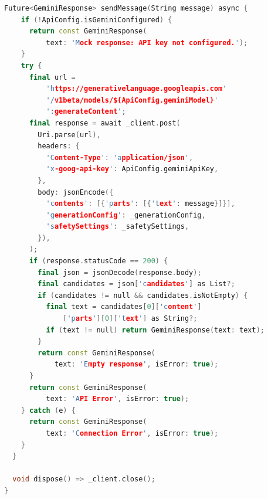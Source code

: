 \documentclass[12pt]{article}
\begin{document}
\begin{lstlisting}[language=C++]
  Future<GeminiResponse> sendMessage(String message) async {
    if (!ApiConfig.isGeminiConfigured) {
      return const GeminiResponse(
          text: 'Mock response: API key not configured.');
    }
    try {
      final url =
          'https://generativelanguage.googleapis.com'
          '/v1beta/models/${ApiConfig.geminiModel}'
          ':generateContent';
      final response = await _client.post(
        Uri.parse(url),
        headers: {
          'Content-Type': 'application/json',
          'x-goog-api-key': ApiConfig.geminiApiKey,
        },
        body: jsonEncode({
          'contents': [{'parts': [{'text': message}]}],
          'generationConfig': _generationConfig,
          'safetySettings': _safetySettings,
        }),
      );
      if (response.statusCode == 200) {
        final json = jsonDecode(response.body);
        final candidates = json['candidates'] as List?;
        if (candidates != null && candidates.isNotEmpty) {
          final text = candidates[0]['content']
              ['parts'][0]['text'] as String?;
          if (text != null) return GeminiResponse(text: text);
        }
        return const GeminiResponse(
            text: 'Empty response', isError: true);
      }
      return const GeminiResponse(
          text: 'API Error', isError: true);
    } catch (e) {
      return const GeminiResponse(
          text: 'Connection Error', isError: true);
    }
  }

  void dispose() => _client.close();
}
\end{lstlisting}
\end{document}

